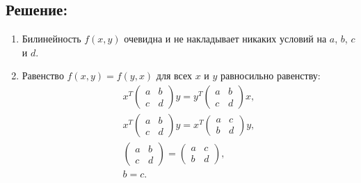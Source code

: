 \documentclass[12pt]{article}
\begin{document}
    \subsection*{Решение:}
    \begin{enumerate}
        \item
        Билинейность $f(x,y)$ очевидна и не накладывает никаких условий на $a$, $b$, $c$ и $d$.

        \item
        Равенство $f(x,y) = f(y,x)$ для всех $x$ и $y$ равносильно равенству:
        \begin{gather*}
            x^T
            \begin{pmatrix}
                a & b \\
                c & d
            \end{pmatrix}
            y
            =
            y^T
            \begin{pmatrix}
                a & b \\
                c & d
            \end{pmatrix}
            x , \\
            x^T
            \begin{pmatrix}
                a & b \\
                c & d
            \end{pmatrix}
            y
            =
            x^T
            \begin{pmatrix}
                a & c \\
                b & d
            \end{pmatrix}
            y , \\
            \begin{pmatrix}
                a & b \\
                c & d
            \end{pmatrix}
            =
            \begin{pmatrix}
                a & c \\
                b & d
            \end{pmatrix}, \\
            b = c .
        \end{gather*}


\end{enumerate}
\end{document}
